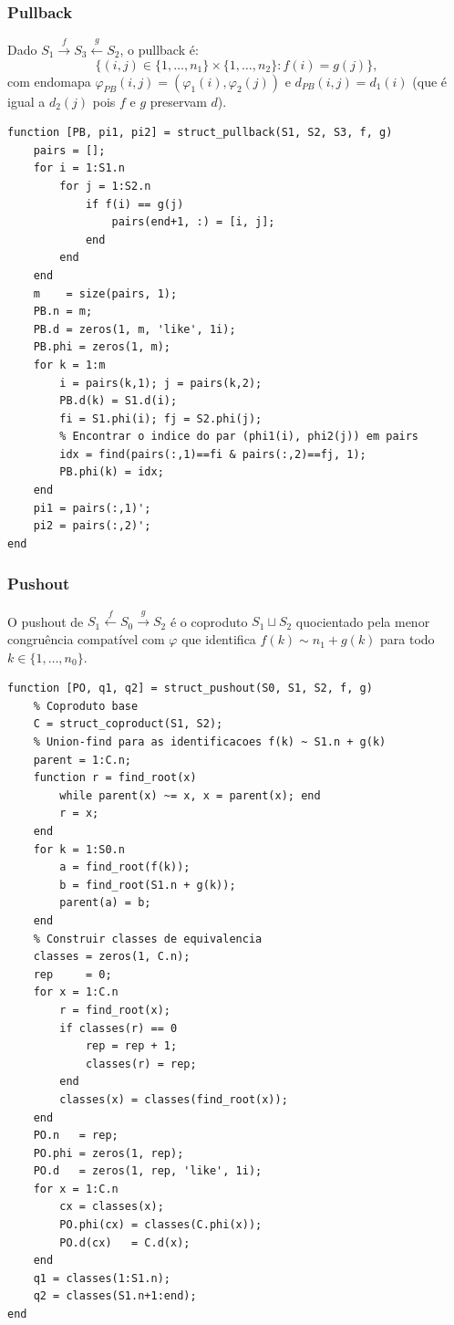 \subsubsection{Pullback}

Dado $S_1 \xrightarrow{f} S_3 \xleftarrow{g} S_2$, o pullback é:
\[
    \{(i,j) \in \{1,\ldots,n_1\} \times \{1,\ldots,n_2\} : f(i) = g(j)\},
\]
com endomapa $\varphi_{PB}(i,j) = (\varphi_1(i), \varphi_2(j))$ e $d_{PB}(i,j) = d_1(i)$ (que é igual a $d_2(j)$ pois $f$ e $g$ preservam $d$).

\begin{lstlisting}[style=matlab, caption={Pullback em Struct}]
function [PB, pi1, pi2] = struct_pullback(S1, S2, S3, f, g)
    pairs = [];
    for i = 1:S1.n
        for j = 1:S2.n
            if f(i) == g(j)
                pairs(end+1, :) = [i, j];
            end
        end
    end
    m    = size(pairs, 1);
    PB.n = m;
    PB.d = zeros(1, m, 'like', 1i);
    PB.phi = zeros(1, m);
    for k = 1:m
        i = pairs(k,1); j = pairs(k,2);
        PB.d(k) = S1.d(i);
        fi = S1.phi(i); fj = S2.phi(j);
        % Encontrar o indice do par (phi1(i), phi2(j)) em pairs
        idx = find(pairs(:,1)==fi & pairs(:,2)==fj, 1);
        PB.phi(k) = idx;
    end
    pi1 = pairs(:,1)';
    pi2 = pairs(:,2)';
end
\end{lstlisting}

\subsubsection{Pushout}

O pushout de $S_1 \xleftarrow{f} S_0 \xrightarrow{g} S_2$ é o coproduto $S_1 \sqcup S_2$ quocientado pela menor congruência compatível com $\varphi$ que identifica $f(k) \sim n_1 + g(k)$ para todo $k \in \{1,\ldots,n_0\}$.

\begin{lstlisting}[style=matlab, caption={Pushout em Struct (via union-find)}]
function [PO, q1, q2] = struct_pushout(S0, S1, S2, f, g)
    % Coproduto base
    C = struct_coproduct(S1, S2);
    % Union-find para as identificacoes f(k) ~ S1.n + g(k)
    parent = 1:C.n;
    function r = find_root(x)
        while parent(x) ~= x, x = parent(x); end
        r = x;
    end
    for k = 1:S0.n
        a = find_root(f(k));
        b = find_root(S1.n + g(k));
        parent(a) = b;
    end
    % Construir classes de equivalencia
    classes = zeros(1, C.n);
    rep     = 0;
    for x = 1:C.n
        r = find_root(x);
        if classes(r) == 0
            rep = rep + 1;
            classes(r) = rep;
        end
        classes(x) = classes(find_root(x));
    end
    PO.n   = rep;
    PO.phi = zeros(1, rep);
    PO.d   = zeros(1, rep, 'like', 1i);
    for x = 1:C.n
        cx = classes(x);
        PO.phi(cx) = classes(C.phi(x));
        PO.d(cx)   = C.d(x);
    end
    q1 = classes(1:S1.n);
    q2 = classes(S1.n+1:end);
end
\end{lstlisting}

